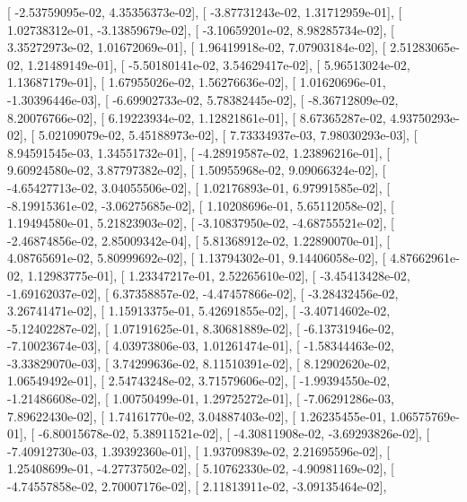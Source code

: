 \documentclass{article}
\begin{document}
       [ -2.53759095e-02,   4.35356373e-02],
       [ -3.87731243e-02,   1.31712959e-01],
       [  1.02738312e-01,  -3.13859679e-02],
       [ -3.10659201e-02,   8.98285734e-02],
       [  3.35272973e-02,   1.01672069e-01],
       [  1.96419918e-02,   7.07903184e-02],
       [  2.51283065e-02,   1.21489149e-01],
       [ -5.50180141e-02,   3.54629417e-02],
       [  5.96513024e-02,   1.13687179e-01],
       [  1.67955026e-02,   1.56276636e-02],
       [  1.01620696e-01,  -1.30396446e-03],
       [ -6.69902733e-02,   5.78382445e-02],
       [ -8.36712809e-02,   8.20076766e-02],
       [  6.19223934e-02,   1.12821861e-01],
       [  8.67365287e-02,   4.93750293e-02],
       [  5.02109079e-02,   5.45188973e-02],
       [  7.73334937e-03,   7.98030293e-03],
       [  8.94591545e-03,   1.34551732e-01],
       [ -4.28919587e-02,   1.23896216e-01],
       [  9.60924580e-02,   3.87797382e-02],
       [  1.50955968e-02,   9.09066324e-02],
       [ -4.65427713e-02,   3.04055506e-02],
       [  1.02176893e-01,   6.97991585e-02],
       [ -8.19915361e-02,  -3.06275685e-02],
       [  1.10208696e-01,   5.65112058e-02],
       [  1.19494580e-01,   5.21823903e-02],
       [ -3.10837950e-02,  -4.68755521e-02],
       [ -2.46874856e-02,   2.85009342e-04],
       [  5.81368912e-02,   1.22890070e-01],
       [  4.08765691e-02,   5.80999692e-02],
       [  1.13794302e-01,   9.14406058e-02],
       [  4.87662961e-02,   1.12983775e-01],
       [  1.23347217e-01,   2.52265610e-02],
       [ -3.45413428e-02,  -1.69162037e-02],
       [  6.37358857e-02,  -4.47457866e-02],
       [ -3.28432456e-02,   3.26741471e-02],
       [  1.15913375e-01,   5.42691855e-02],
       [ -3.40714602e-02,  -5.12402287e-02],
       [  1.07191625e-01,   8.30681889e-02],
       [ -6.13731946e-02,  -7.10023674e-03],
       [  4.03973806e-03,   1.01261474e-01],
       [ -1.58344463e-02,  -3.33829070e-03],
       [  3.74299636e-02,   8.11510391e-02],
       [  8.12902620e-02,   1.06549492e-01],
       [  2.54743248e-02,   3.71579606e-02],
       [ -1.99394550e-02,  -1.21486608e-02],
       [  1.00750499e-01,   1.29725272e-01],
       [ -7.06291286e-03,   7.89622430e-02],
       [  1.74161770e-02,   3.04887403e-02],
       [  1.26235455e-01,   1.06575769e-01],
       [ -6.80015678e-02,   5.38911521e-02],
       [ -4.30811908e-02,  -3.69293826e-02],
       [ -7.40912730e-03,   1.39392360e-01],
       [  1.93709839e-02,   2.21695596e-02],
       [  1.25408699e-01,  -4.27737502e-02],
       [  5.10762330e-02,  -4.90981169e-02],
       [ -4.74557858e-02,   2.70007176e-02],
       [  2.11813911e-02,  -3.09135464e-02],
\end{document}
